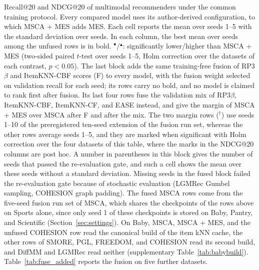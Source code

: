 \begin{table}[t]
\caption{Recall@20 and NDCG@20 of multimodal recommenders under the common training protocol. Every compared model uses its author-derived configuration, to which MSCA + MES adds MES. Each cell reports the mean over seeds 1--5 with the standard deviation over seeds. In each column, the best mean over seeds among the unfused rows is in bold. $^{\blacktriangledown}$/$^{\blacktriangle}$: significantly lower/higher than MSCA + MES (two-sided paired $t$-test over seeds 1--5, Holm correction over the datasets of each contrast, $p<0.05$). The last block adds the same training-free fusion of RP3$\beta$ and ItemKNN-CBF scores (F) to every model, with the fusion weight selected on validation recall for each seed; its rows carry no bold, and no model is claimed to rank first after fusion. Its last four rows fuse the validation mix of RP3$\beta$, ItemKNN-CBF, ItemKNN-CF, and EASE instead, and give the margin of MSCA + MES over MSCA after F and after the mix. The two margin rows ($^{\dagger}$) use seeds 1--10 of the preregistered ten-seed extension of the fusion run set, whereas the other rows average seeds 1--5, and they are marked when significant with Holm correction over the four datasets of this table, where the marks in the NDCG@20 columns are post hoc. A number in parentheses in this block gives the number of seeds that passed the re-evaluation gate, and such a cell shows the mean over these seeds without a standard deviation. Missing seeds in the fused block failed the re-evaluation gate because of stochastic evaluation (LGMRec Gumbel sampling, COHESION graph padding). The fused MSCA rows come from the five-seed fusion run set of MSCA, which shares the checkpoints of the rows above on Sports alone, since only seed 1 of these checkpoints is stored on Baby, Pantry, and Scientific (Section~\ref{sec:settings}). On Baby, MSCA, MSCA + MES, and the unfused COHESION row read the canonical build of the item kNN cache, the other rows of SMORE, PGL, FREEDOM, and COHESION read its second build, and DiffMM and LGMRec read neither (supplementary Table~\ref{tab:babybuild}). Table~\ref{tab:fuse_added} reports the fusion on five further datasets.}

\end{table}
